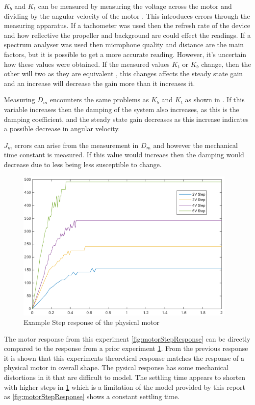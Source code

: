 \documentclass[a4paper, 11pt, compsoc]{IEEEtran}
\begin{document}
            \par
            $K_b$ and $K_t$ can be measured by measuring the voltage across the motor and dividing by the angular velocity of the motor \cite{gouws_2008}. This introduces errors through the measuring apparatus. If a tachometer was used then the refresh rate of the device and how reflective the propeller and background are could effect the readings. If a spectrum analyser was used then microphone quality and distance are the main factors, but it is possible to get a more accurate reading. However, it's uncertain how these values were obtained. If the measured values $K_t$ or $K_b$ change, then the other will two as they are equivalent \cite{gouws_2008}, this changes affects the steady state gain and an increase will decrease the gain more than it increases it.
            \par
            Measuring $D_m$ encounters the same problems as $K_b$ and $K_t$ as shown in \cite{gouws_2008}. If this variable increases then the damping of the system also increases, as this is the damping coefficient, and the steady state gain decreases as this increase indicates a possible decrease in angular velocity.
            \par
            $J_m$ errors can arise from the measurement in $D_m$ and however the mechanical time constant is measured. If this value would increaes then the damping would decrease due to less being less susceptible to change.
            \par
            \begin{figure}[!h]
                \centering
                \includegraphics[width=\columnwidth]{exampleMotorResponse.png}
                \caption{Example Step response of the physical motor}
                \label{fig:exampleMotor}
            \end{figure}
            The motor response from this experiment \cref{fig:motorStepResponse} can be directly compared to the response from a prior experiment \cref{fig:exampleMotor}. From the previous response it is shown that this experiments theoretical response matches the response of a physical motor in overall shape. The pysical response has some mechanical distortions in it that are difficult to model. The settling time appears to shorten with higher steps in \cref{fig:exampleMotor} which is a limitation of the model provided by this report as \cref{fig:motorStepResponse} shows a constant settling time.
\end{document}
